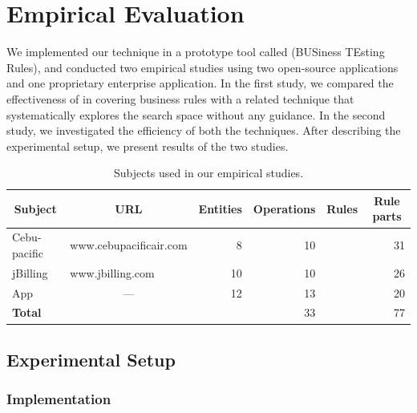 \section{Empirical Evaluation}
\label{sec:eval}

We implemented our technique in a prototype tool called \tool{} (BUSiness
TEsting Rules), and conducted two empirical studies using two open-source
applications and one proprietary enterprise application. In the first study, we
compared the effectiveness of \tool{} in covering business rules with a related
technique that systematically explores the search space without any guidance. In
the second study, we investigated the efficiency of both the techniques. After
describing the experimental setup, we present results of the two studies.

\begin{table}[t]
\caption{Subjects used in our empirical studies.}
\centering
{\scriptsize
\tabcolsep=3pt
\begin{tabular}{|l|l|r|r|r|r|}
\hline
\multicolumn{1}{|c|}{Subject} & \multicolumn{1}{|c|}{URL} & \multicolumn{1}{|c|}{Entities} & \multicolumn{1}{|c|}{Operations} & \multicolumn{1}{|c|}{Rules} & \multicolumn{1}{|c|}{Rule parts} \\
\hline \hline
Cebu-pacific & www.cebupacificair.com 		& 8  & 10 &  	 & 31 \\
jBilling 		 & www.jbilling.com 					& 10 & 10 &   	 & 26 \\
App 				 & \multicolumn{1}{|c|}{---}	& 12 & 13 &     & 20 \\
\hline \hline
\textbf{Total} & 													& 	 & 33 &     & 77 \\
\hline
\end{tabular}
}
\label{tab:subjects}
\end{table}


\subsection{Experimental Setup}

\subsubsection{Implementation}
\label{sec:impl}

